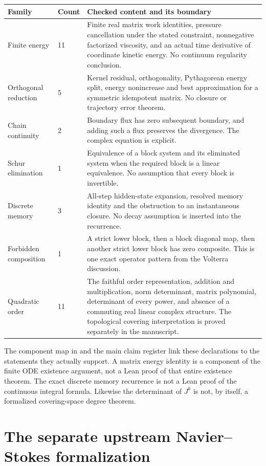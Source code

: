 \begin{longtable}{p{}p{}p{}}
\toprule Family & Count & Checked content and its boundary\\\midrule
\endhead
Finite energy & 11 & Finite real matrix work identities, pressure cancellation under the stated constraint, nonnegative factorized viscosity, and an actual time derivative of coordinate kinetic energy. No continuum regularity conclusion.\\
Orthogonal reduction & 5 & Kernel residual, orthogonality, Pythagorean energy split, energy nonincrease and best approximation for a symmetric idempotent matrix. No closure or trajectory error theorem.\\
Chain continuity & 2 & Boundary flux has zero subsequent boundary, and adding such a flux preserves the divergence. The complex equation is explicit.\\
Schur elimination & 1 & Equivalence of a block system and its eliminated system when the required block is a linear equivalence. No assumption that every block is invertible.\\
Discrete memory & 3 & All-step hidden-state expansion, resolved memory identity and the obstruction to an instantaneous closure. No decay assumption is inserted into the recurrence.\\
Forbidden composition & 1 & A strict lower block, then a block diagonal map, then another strict lower block has zero composite. This is one exact operator pattern from the Volterra discussion.\\
Quadratic order & 11 & The faithful order representation, addition and multiplication, norm determinant, matrix polynomial, determinant of every power, and absence of a commuting real linear complex structure. The topological covering interpretation is proved separately in the manuscript.\\
\bottomrule
\end{longtable}

The component map in  and the main claim register link these declarations to the statements they actually support. A matrix energy identity is a component of the finite ODE existence argument, not a Lean proof of that entire existence theorem. The exact discrete memory recurrence is not a Lean proof of the continuous integral formula. Likewise the determinant of $J^k$ is not, by itself, a formalized covering-space degree theorem.

\section{The separate upstream Navier--Stokes formalization}

